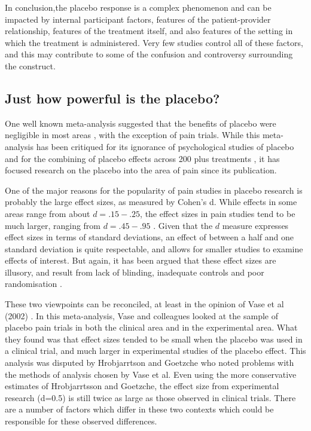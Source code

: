 In conclusion,the placebo response is a complex phenomenon and can be impacted by internal  participant factors, features of the patient-provider relationship, features of the treatment itself, and also features of the setting in which the treatment is administered. Very few studies control all of these factors, and this may contribute to some of the confusion and controversy surrounding the construct. 

\subsection{Just how powerful is the placebo?}

One well known meta-analysis suggested that the benefits of placebo were negligible in most areas \cite{hrobjartsson2001placebo}, with the exception of pain trials. While this meta-analysis has been critiqued for its ignorance of psychological studies of placebo \cite{Evans2003, Stewart-Williams2004b}  and for the combining of placebo effects across 200 plus treatments \cite{Wickramasekera2001}, it has focused research on the placebo into the area of pain since its publication. 

One of the major reasons for the popularity of pain studies in placebo research is probably the large effect sizes, as measured by Cohen's d. While effects in some areas range from about $d=.15-.25$, the effect sizes in pain studies tend to be much larger, ranging from $d=.45-.95$ \cite{Vase2002}. Given that the $d$ measure  expresses effect sizes in terms of standard deviations, an effect of between a half and one standard deviation is quite respectable, and allows for smaller studies to examine effects of interest.  But again, it has been argued that these effect sizes are illusory, and result from lack of blinding, inadequate controls and poor randomisation \cite{Hrobjartsson2003,Kienle1997} . 

These two viewpoints can be reconciled, at least in the opinion of Vase et al  (2002) \cite{Vase2002}. In this meta-analysis, Vase and colleagues looked at the sample of placebo pain trials in both the clinical area and in the experimental area. What they found was that effect sizes tended to be small when the placebo was used in a clinical trial, and much larger in experimental studies of the placebo effect. This analysis was disputed by Hrobjarrtson and Goetzche \cite{Hrobjartsson2003} who noted problems with the methods of analysis chosen by Vase et al. Even using the more conservative estimates of Hrobjarrtsson and Goetzche, the effect size from experimental research (d=0.5) is still twice as large as those observed in clinical trials. There are a number of factors which differ in these two contexts which could be responsible for these observed differences. 

